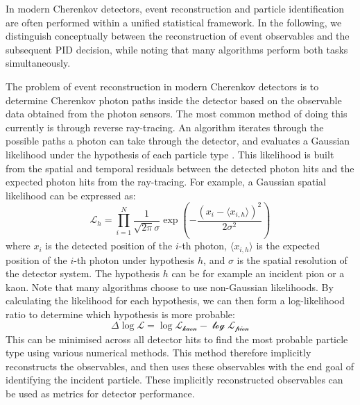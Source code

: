 
In modern Cherenkov detectors, event reconstruction and particle identification are often performed within a unified statistical framework. In the following, we distinguish conceptually between the reconstruction of event observables and the subsequent PID decision, while noting that many algorithms perform both tasks simultaneously.

The problem of event reconstruction in modern Cherenkov detectors is to determine Cherenkov photon paths inside the detector based on the observable data obtained from the photon sensors. The most common method of doing this currently is through reverse ray-tracing. An algorithm iterates through the possible paths a photon can take through the detector, and evaluates a Gaussian likelihood under the hypothesis of each particle type \nolinebreak\cite{Santelj_2017}.
This likelihood is built from the spatial and temporal residuals between the detected photon hits and the expected photon hits from the ray-tracing. For example, a Gaussian spatial
likelihood can be expressed as:
\begin{equation}
    \mathcal{L}_h = \prod_{i=1}^{N} \frac{1}{\sqrt{2 \pi} \sigma} \exp \left( -{\frac{( x_i - \langle x_{i,h} \rangle)^2}{2 \sigma^2}} \right)
\end{equation}
where \(x_i\) is the detected position of the \(i\)-th photon, \(\langle x_{i,h} \rangle\) is the expected position
of the \(i\)-th photon under hypothesis \(h\), and \(\sigma\) is the spatial resolution of the detector system.
The hypothesis \(h\) can be for example an incident pion or a kaon. Note that many algorithms choose to use non-Gaussian likelihoods. 
By calculating the likelihood for each hypothesis, we can then form a log-likelihood ratio to determine which 
hypothesis is more probable:
\begin{equation}
    \Delta \log \mathcal{L} = \log \mathcal{L_{\text{kaon}} - \log \mathcal{L}_{\text{pion}}}
\end{equation}
This can be minimised across all detector hits to find the most probable particle type using various numerical methods. This method therefore implicitly reconstructs the observables, and then uses these observables with the end goal of identifying the incident particle. These implicitly reconstructed observables can be used as metrics for detector performance.

